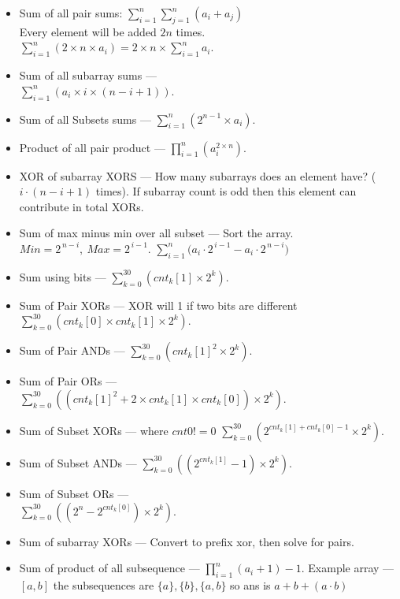 \vspace{-4.5mm}
{\footnotesize
\begin{itemize}
\item Sum of all pair sums: $\sum_{i=1}^{n} \sum_{j=1}^{n} (a_i + a_j)$\\
Every element will be added $2n$ times.
$\sum_{i=1}^{n} (2 \times n \times a_{i}) = 2 \times n \times \sum_{i=1}^{n} a_{i}.$
\item Sum of all subarray sums — \\
$\sum_{i=1}^{n} \left(a_{i} \times i \times (n - i + 1)\right).$
\item Sum of all Subsets sums —
$\sum_{i=1}^{n} \left(2^{n-1} \times a_{i}\right).$
\item Product of all pair product —
$\prod_{i=1}^{n} \left(a_{i}^{2 \times n}\right).$
\item XOR of subarray XORS — How many subarrays does an element have? ($i \cdot (n - i + 1)$ times). If subarray count is odd then this element can contribute in total XORs.
\item Sum of max minus min over all subset — Sort the array. $Min = 2^{\,n-i}, \ Max = 2^{\,i-1}$. $\sum_{i=1}^{n} \big(a_i \cdot 2^{\,i-1} - a_i \cdot 2^{\,n-i}\big)$
\item Sum using bits —
$\sum_{k=0}^{30} \left(cnt_{k}[1] \times 2^{k}\right).$
\item Sum of Pair XORs — XOR will 1 if two bits
are different
$\sum_{k=0}^{30} \left(cnt_{k}[0] \times cnt_{k}[1] \times 2^{k}\right).$
\item Sum of Pair ANDs — 
$\sum_{k=0}^{30} \left(cnt_{k}[1]^2 \times 2^{k}\right).$
\item Sum of Pair ORs — \\
$\sum_{k=0}^{30} \left( \left( cnt_{k}[1]^{2} + 2 \times cnt_{k}[1] \times cnt_{k}[0] \right) \times 2^{k} \right).$
\item Sum of Subset XORs — where $cnt0 != 0$
$\sum_{k=0}^{30} \left(2^{cnt_{k}[1] + cnt_{k}[0] - 1} \times 2^{k}\right).$
\item Sum of Subset ANDs — 
$\sum_{k=0}^{30} \left( \left(2^{cnt_{k}[1]} - 1\right) \times 2^{k} \right).$
\item Sum of Subset ORs — \\
$\sum_{k=0}^{30} \left( \left(2^{n} - 2^{cnt_{k}[0]}\right) \times 2^{k} \right).$
\item Sum of subarray XORs — Convert to prefix xor, then solve for pairs.
\item Sum of product of all subsequence — $\prod_{i=1}^{n} (a_i+1)-1$.
Example array — $[a,b]$ the subsequences are $\{a\}, \{b\}, \{a,b\}$ so ans is $a + b + (a \cdot b)$
\end{itemize}
}


